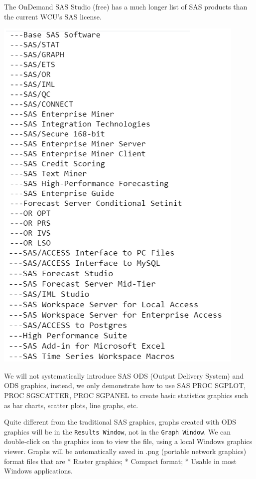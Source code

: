 \documentclass[
]{book}
\begin{document}
The OnDemand SAS Studio (free) has a much longer list of SAS products than the current WCU's SAS license.

\begin{center}\includegraphics[width=1\linewidth]{img06/w06-SASStudioOnDemand} \end{center}

We will not systematically introduce SAS ODS (Output Delivery System) and ODS graphics, instead, we only demonstrate how to use SAS PROC SGPLOT, PROC SGSCATTER, PROC SGPANEL to create basic statistics graphics such as bar charts, scatter plots, line graphs, etc.

Quite different from the traditional SAS graphics, graphs created with ODS graphics will be in the \texttt{Results\ Window}, not in the \texttt{Graph\ Window}. We can double‐click on the graphics icon to view the file, using a local Windows graphics viewer. Graphs will be automatically saved in .png (portable network graphics) format
files that are
* Raster graphics;
* Compact format;
* Usable in most Windows applications.
\end{document}
